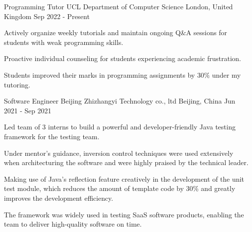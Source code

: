 
\begin{cventries}

  \cventry
    {Programming Tutor} %
    {UCL Department of Computer Science } %
    {London, United Kingdom} %
    {Sep 2022 - Present} %
    {
      \begin{cvitems}
        \item {Actively organize weekly tutorials and maintain ongoing Q\&A sessions for students with weak programming skills.}
        \item {Proactive individual counseling for students experiencing academic frustration.}
        \item {Students improved their marks in programming assignments by 30\% under my tutoring.}
      \end{cvitems}
    }

  \cventry
    {Software Engineer} %
    {Beijing Zhizhangyi Technology co., ltd} %
    {Beijing, China} %
    {Jun 2021 - Sep 2021} %
    {
      \begin{cvitems}
        \item {Led team of 3 interns to build a powerful and developer-friendly Java testing framework for the testing team.}
        \item {Under mentor's guidance, inversion control techniques were used extensively when architecturing the software and were highly praised by the technical leader.}
        \item {Making use of Java's reflection feature creatively in the development of the unit test module, which reduces the amount of template code by 30\% and greatly improves the development efficiency.}
        \item {The framework was widely used in testing SaaS software products, enabling the team to deliver high-quality software on time.}
      \end{cvitems}
    }

\end{cventries}
